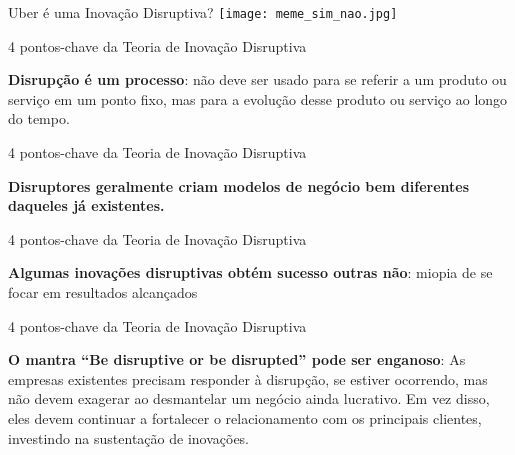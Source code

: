 \begin{frame}{Uber é uma Inovação Disruptiva?}
	\centering
	\texttt{[image: meme\_sim\_nao.jpg]}
\end{frame}

\begin{frame}{4 pontos-chave da Teoria de Inovação Disruptiva}
    \begin{vfilleditems}
    \item[1] \textbf{Disrupção é um processo}: não deve ser usado para se referir a um
	    produto ou serviço em um ponto fixo, mas para a evolução desse produto
	    ou serviço ao longo do tempo.
    \end{vfilleditems}
\end{frame}

\begin{frame}{4 pontos-chave da Teoria de Inovação Disruptiva}
    \begin{vfilleditems}
    \item[2] \textbf{Disruptores geralmente criam modelos de negócio bem diferentes daqueles já existentes.}
    \end{vfilleditems}
\end{frame}

\begin{frame}{4 pontos-chave da Teoria de Inovação Disruptiva}
    \begin{vfilleditems}
    \item[3] \textbf{Algumas inovações disruptivas obtém sucesso outras não}: 
	    miopia de se focar em resultados alcançados
    \end{vfilleditems}
\end{frame}

\begin{frame}{4 pontos-chave da Teoria de Inovação Disruptiva}
    \begin{vfilleditems}
    \item[4] \textbf{O mantra “Be disruptive or be disrupted” pode ser enganoso}:
	    As empresas existentes precisam responder à disrupção, se estiver ocorrendo,
	    mas não devem exagerar ao desmantelar um negócio ainda lucrativo. Em vez disso,
	    eles devem continuar a fortalecer o relacionamento com os principais clientes,
	    investindo na sustentação de inovações.
    \end{vfilleditems}
\end{frame}


